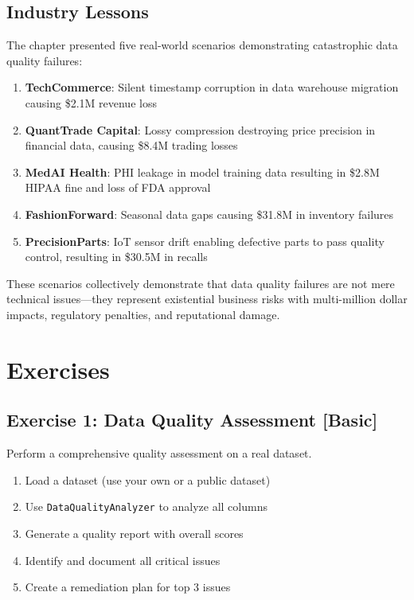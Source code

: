 \subsection{Industry Lessons}

The chapter presented five real-world scenarios demonstrating catastrophic data quality failures:

\begin{enumerate}
    \item \textbf{TechCommerce}: Silent timestamp corruption in data warehouse migration causing \$2.1M revenue loss

    \item \textbf{QuantTrade Capital}: Lossy compression destroying price precision in financial data, causing \$8.4M trading losses

    \item \textbf{MedAI Health}: PHI leakage in model training data resulting in \$2.8M HIPAA fine and loss of FDA approval

    \item \textbf{FashionForward}: Seasonal data gaps causing \$31.8M in inventory failures

    \item \textbf{PrecisionParts}: IoT sensor drift enabling defective parts to pass quality control, resulting in \$30.5M in recalls
\end{enumerate}

These scenarios collectively demonstrate that data quality failures are not mere technical issues---they represent existential business risks with multi-million dollar impacts, regulatory penalties, and reputational damage.

\section{Exercises}

\subsection{Exercise 1: Data Quality Assessment [Basic]}

Perform a comprehensive quality assessment on a real dataset.

\begin{enumerate}
    \item Load a dataset (use your own or a public dataset)
    \item Use \texttt{DataQualityAnalyzer} to analyze all columns
    \item Generate a quality report with overall scores
    \item Identify and document all critical issues
    \item Create a remediation plan for top 3 issues
\end{enumerate}

